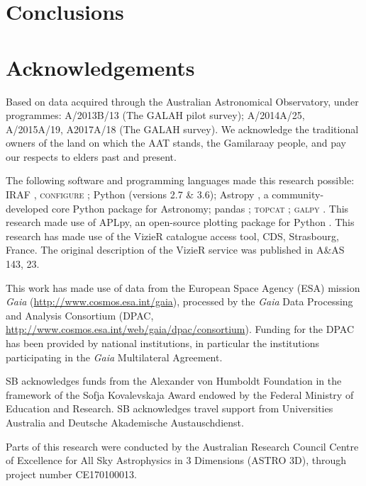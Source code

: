 \documentclass[fleqn,usenatbib,useAMS]{mnras}
\begin{document}
\section{Conclusions} \label{sec:conclusions}


\section*{Acknowledgements}
Based on data acquired through the Australian Astronomical Observatory, under programmes: A/2013B/13 (The GALAH pilot survey); A/2014A/25, A/2015A/19, A2017A/18 (The GALAH survey). We acknowledge the traditional owners of the land on which the AAT stands, the Gamilaraay people, and pay our respects to elders past and present.

The following software and programming languages made this research possible: \textsc{IRAF} \citep{Tody1986,Tody1993}, \textsc{configure} \citep{Miszalski2006}; Python (versions 2.7 \& 3.6); Astropy \citep[version 2.0;][]{Robitaille2013,PriceWhelan2018}, a community-developed core Python package for Astronomy; pandas \citep[version 0.20.2;][]{McKinney2011}; \textsc{topcat} \citep[version 4.4;][]{Taylor2005}; \textsc{galpy} \citep[version 1.3;][]{Bovy2015}. This research made use of APLpy, an open-source plotting package for Python \citep{Robitaille2012}. This research has made use of the VizieR catalogue access tool, CDS, Strasbourg, France. The original description of the VizieR service was published in A\&AS 143, 23.

This work has made use of data from the European Space Agency (ESA) mission {\it Gaia} (\url{http://www.cosmos.esa.int/gaia}), processed by the {\it Gaia} Data Processing and Analysis Consortium (DPAC, \url{http://www.cosmos.esa.int/web/gaia/dpac/consortium}). Funding for the DPAC has been provided by national institutions, in particular the institutions participating in the {\it Gaia} Multilateral Agreement.

SB acknowledges funds from the Alexander von Humboldt Foundation in the framework of the Sofja Kovalevskaja Award endowed by the Federal Ministry of Education and Research. SB acknowledges travel support from Universities Australia and Deutsche Akademische Austauschdienst. 

Parts of this research were conducted by the Australian Research Council Centre of Excellence for All Sky Astrophysics in 3 Dimensions (ASTRO 3D), through project number CE170100013. 
\end{document}
